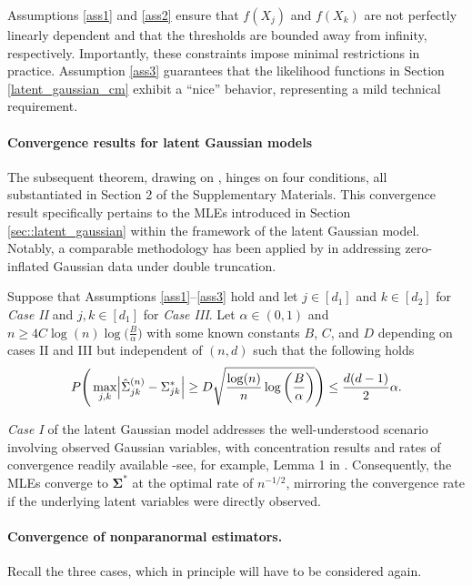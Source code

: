 Assumptions \ref{ass1} and \ref{ass2} ensure that $f(X_j)$ and $f(X_k)$ are not perfectly linearly dependent and that the thresholds are bounded away from infinity, respectively. Importantly, these constraints impose minimal restrictions in practice. Assumption \ref{ass3} guarantees that the likelihood functions in Section \ref{latent_gaussian_cm} exhibit a ``nice'' behavior, representing a mild technical requirement.

\paragraph{Convergence results for latent Gaussian  models}
The subsequent theorem, drawing on \citet{Mei18}, hinges on four conditions, all substantiated in Section 2 of the Supplementary Materials. This convergence result specifically pertains to the MLEs introduced in Section \ref{sec::latent_gaussian} within the framework of the latent Gaussian model. Notably, a comparable methodology has been applied by \citet{Anne19} in addressing zero-inflated Gaussian data under double truncation.

\begin{theorem}\label{uniform_convergence}
    Suppose that Assumptions \ref{ass1}--\ref{ass3} hold and let $j \in [d_1]$ and $k \in [d_2]$ for  \textit{Case II} and $j,k \in [d_1]$ for \textit{Case III}. Let $\alpha \in (0,1)$ and \(n \geq 4 C \log(n) \log\Big(\frac{B}{\alpha}\Big)\) with some known constants $B$, $C$, and $D$ depending on cases II and III but independent of $(n,d)$ such that the following holds
    \begin{equation}
        P\Bigg(\max_{j,k}\abs{\hat{\Sigma}_{jk}^{(n)} - \Sigma_{jk}^{*}} \geq D\sqrt{\frac{\log(n)}{n} \log\bigg(\frac{B}{\alpha}\bigg)}\Bigg) \leq \frac{d(d-1)}{2}\alpha.
    \end{equation}
\end{theorem}
\textit{Case I} of the latent Gaussian model addresses the well-understood scenario involving observed Gaussian variables, with concentration results and rates of convergence readily available -see, for example, Lemma 1 in \citet{Ravikumar11}. Consequently, the MLEs converge to \(\mathbf{\Sigma}^{*}\) at the optimal rate of \(n^{-1/2}\), mirroring the convergence rate if the underlying latent variables were directly observed.

\paragraph{Convergence of nonparanormal estimators.} Recall the three cases, which in principle will have to be considered again.

